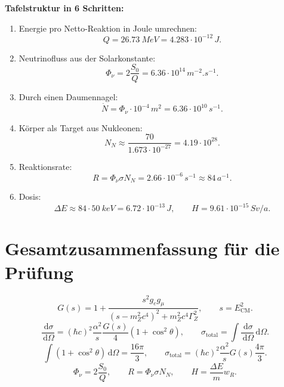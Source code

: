 \documentclass[11pt,a4paper]{scrartcl}
\newcommand{\paren}[1]{\left( #1 \right)}
\newcommand{\dd}{\,\mathrm{d}}
\newcommand{\diffxs}{\frac{\dd\sigma}{\dd\Omega}}
\theoremstyle{definition}
\theoremstyle{plain}
\theoremstyle{remark}
\begin{document}
\begin{talkbox}
\textbf{Tafelstruktur in 6 Schritten:}
\begin{enumerate}
    \item Energie pro Netto-Reaktion in Joule umrechnen:
    \[
        Q=\SI{26.73}{MeV}=4.283\cdot10^{-12}\,\si{J}.
    \]
    \item Neutrinofluss aus der Solarkonstante:
    \[
        \Phi_\nu=2\frac{S_0}{Q}=6.36\cdot10^{14}\,\si{m^{-2}.s^{-1}}.
    \]
    \item Durch einen Daumennagel:
    \[
        \dot N=\Phi_\nu\cdot10^{-4}\,\si{m^2}=6.36\cdot10^{10}\,\si{s^{-1}}.
    \]
    \item Körper als Target aus Nukleonen:
    \[
        N_N\approx\frac{70}{1.673\cdot10^{-27}}=4.19\cdot10^{28}.
    \]
    \item Reaktionsrate:
    \[
        R=\Phi_\nu\sigma N_N=2.66\cdot10^{-6}\,\si{s^{-1}}\approx84\,\si{a^{-1}}.
    \]
    \item Dosis:
    \[
        \Delta E\approx84\cdot\SI{50}{keV}=6.72\cdot10^{-13}\,\si{J},
        \qquad
        H=9.61\cdot10^{-15}\,\si{Sv/a}.
    \]
\end{enumerate}
\end{talkbox}

\FloatBarrier
\newpage

\section{Gesamtzusammenfassung für die Prüfung}

\begin{summarybox}[title={Formeln, die man können sollte}]
\[
    G(s)=1+\frac{s^2g_eg_\mu}{\paren{s-m_Z^2c^4}^2+m_Z^2c^4\Gamma_Z^2},
    \qquad
    s=E_{\mathrm{CM}}^2.
\]
\[
    \diffxs=(\hbar c)^2\frac{\alpha^2}{s}\frac{G(s)}{4}\paren{1+\cos^2\theta},
    \qquad
    \sigma_{\mathrm{total}}=\int\diffxs\dd\Omega.
\]
\[
    \int(1+\cos^2\theta)\dd\Omega=\frac{16\pi}{3},
    \qquad
    \sigma_{\mathrm{total}}=(\hbar c)^2\frac{\alpha^2}{s}G(s)\frac{4\pi}{3}.
\]
\[
    \Phi_\nu=2\frac{S_0}{Q},
    \qquad
    R=\Phi_\nu\sigma N_N,
    \qquad
    H=\frac{\Delta E}{m}w_R.
\]
\end{summarybox}
\end{document}
